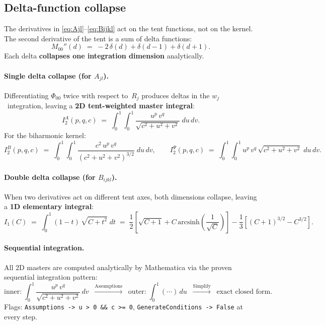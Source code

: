 \documentclass[11pt,a4paper]{article}
\theoremstyle{plain}
\theoremstyle{remark}
\begin{document}
\subsection{Delta-function collapse}

The derivatives in \eqref{eq:Ajl}--\eqref{eq:Bijkl} act on the
tent functions, not on the kernel.  The second derivative of the
tent is a sum of delta functions:
\begin{equation}
  M_{00}''(d) \;=\; -2\,\delta(d) + \delta(d-1) + \delta(d+1).
  \label{eq:tent-delta}
\end{equation}
Each delta \textbf{collapses one integration dimension} analytically.

\paragraph{Single delta collapse (for $A_{jl}$).}
Differentiating $\Phi_{00}$ twice with respect to~$R_j$ produces
deltas in the $w_j$~integration, leaving a \textbf{2D tent-weighted
master integral}:
\begin{equation}
  I^A_2(p,q,c) \;=\;
  \int_0^1\!\int_0^1
  \frac{u^p\,v^q}{\sqrt{c^2 + u^2 + v^2}}\;du\,dv.
  \label{eq:I2A}
\end{equation}
For the biharmonic kernel:
\begin{equation}
  I^B_2(p,q,c) \;=\;
  \int_0^1\!\int_0^1
  \frac{c^2\,u^p\,v^q}{(c^2 + u^2 + v^2)^{3/2}}\;du\,dv,
  \qquad
  I^\Psi_2(p,q,c) \;=\;
  \int_0^1\!\int_0^1
  u^p\,v^q\,\sqrt{c^2 + u^2 + v^2}\;du\,dv.
  \label{eq:I2BPsi}
\end{equation}

\paragraph{Double delta collapse (for $B_{ijkl}$).}
When two derivatives act on different tent axes, both dimensions
collapse, leaving a \textbf{1D elementary integral}:
\begin{equation}
  I_1(C) \;=\;
  \int_0^1 (1-t)\,\sqrt{C + t^2}\;dt
  \;=\; \frac{1}{2}\!\left[\sqrt{C+1} + C\,
  \mathrm{arcsinh}\!\left(\frac{1}{\sqrt{C}}\right)\right]
  - \frac{1}{3}\!\left[(C+1)^{3/2} - C^{3/2}\right].
  \label{eq:I1exact}
\end{equation}

\paragraph{Sequential integration.}
All 2D masters are computed analytically by Mathematica via the proven
sequential integration pattern:
\begin{equation}
  \text{inner:}\;
  \int_0^1 \frac{u^p\,v^q}{\sqrt{c^2+u^2+v^2}}\,dv
  \;\;\xrightarrow{\text{Assumptions}}\;\;
  \text{outer:}\;
  \int_0^1 (\cdots)\,du
  \;\;\xrightarrow{\text{Simplify}}\;\;
  \text{exact closed form.}
\end{equation}
Flags: \texttt{Assumptions -> u > 0 \&\& c >= 0},
\texttt{GenerateConditions -> False} at every step.
\end{document}

